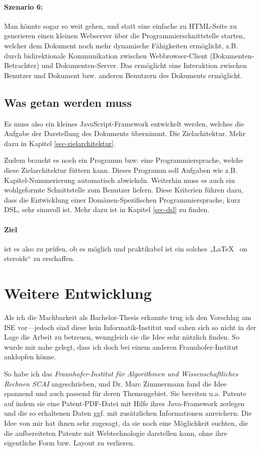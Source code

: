 \paragraph{Szenario 6:} Man könnte sogar so weit gehen, und statt eine einfache
zu HTML-Seite zu generieren einen kleinen Webserver über die
Programmierschnittstelle starten, welcher dem Dokument noch
mehr dynamische Fähigkeiten ermöglicht, z.B. durch bidirektionale
Kommunikation zwischen Webbrowser-Client (Dokumenten-Betrachter) und
Dokumenten-Server. Das ermöglicht eine Interaktion zwischen Benutzer und
Dokument bzw. anderen Benutzern des Dokuments ermöglicht.

\subsection{Was getan werden muss}

Es muss also ein kleines JavaScript-Framework entwickelt werden, welches die
Aufgabe der Darstellung des Dokuments übernimmt. Die Zielachitektur.
Mehr dazu in Kapitel \ref{sec-zielarchitektur}.

Zudem braucht es noch ein Programm bzw. eine Programmiersprache, welche diese
Zielarchitektur füttern kann. Dieses Programm soll Aufgaben wie z.B.
Kapitel-Nummerierung automatisch abwickeln. Weiterhin muss es auch ein
wohlgeformte Schnittstelle zum Benutzer liefern. Diese Kriterien führen
dazu, dass die Entwicklung einer Domänen-Spezifischen Programmiersprache,
kurz DSL, sehr sinnvoll ist. Mehr dazu ist in Kapitel \ref{sec-dsl} zu finden.

\paragraph{Ziel} ist es also zu prüfen, ob es möglich und praktikabel ist
ein solches „\LaTeX~ on steroids“ zu erschaffen.

\section{Weitere Entwicklung}

Als ich die Machbarkeit als Bachelor-Thesis erkannte trug ich den
Vorschlag am ISE vor---jedoch sind
diese kein Informatik-Institut und sahen sich so nicht in der Lage die Arbeit
zu betreuen, wenngleich sie die Idee sehr nützlich finden. So wurde mir
nahe gelegt, dass ich doch bei einem anderen Fraunhofer-Institut anklopfen
könne.

So habe ich das \emph{Fraunhofer-Institut für Algorithmen und Wissenschaftliches
Rechnen SCAI} angeschrieben, und Dr. Marc Zimmermann fand
die Idee spannend und auch passend für deren Themengebiet. Sie bereiten u.a.
Patente auf indem sie eine Patent-PDF-Datei mit Hilfe ihres Java-Framework
zerlegen und die so erhaltenen Daten ggf. mit zusätzlichen Informationen
anreichern. Die Idee von mir hat ihnen sehr zugesagt, da sie noch eine
Möglichkeit suchten, die die aufbereiteten Patente mit Webtechnologie
darstellen kann, ohne ihre eigentliche Form bzw. Layout zu verlieren.

